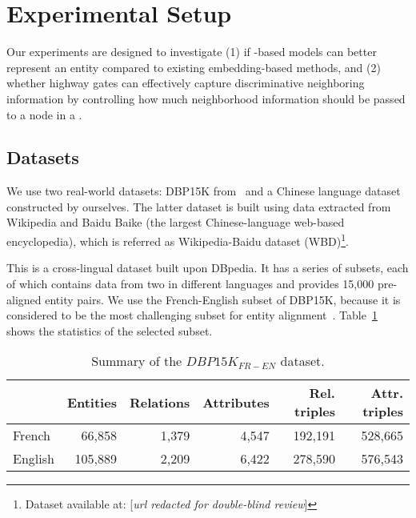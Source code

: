 \section{Experimental Setup}
	Our experiments are designed to investigate (1) if \RGCN-based models can better represent an entity  compared to existing \KG
embedding-based methods, and (2) whether highway gates can effectively capture discriminative neighboring information by controlling how
much neighborhood information should be passed to a node in a \RGCN.

\subsection{Datasets}
\label{subsection:datasets}
	We use two real-world datasets: DBP15K from~\cite{sun2017cross} and a Chinese language dataset constructed by ourselves. The latter
dataset is built using data extracted from Wikipedia and Baidu Baike (the largest Chinese-language web-based encyclopedia), which is
referred as Wikipedia-Baidu dataset (WBD)\footnote{Dataset available at: [\emph{url redacted for double-blind review}]}.
	
	 This is a cross-lingual dataset built upon DBpedia.
	It has a series of subsets, each of which contains data from two \KGs in different languages and provides 15,000 pre-aligned entity pairs.
	We use the French-English subset of DBP15K, because it is considered to be the most challenging subset for entity alignment~\cite{sun2017cross}.
     Table~\ref{dbp} shows the statistics of the selected subset.
	
		\begin{table}
		\centering
		\scriptsize
		\begin{tabular}{l|rrrrr}
			\toprule
			&\bf  Entities &\bf  Relations &\bf  Attributes &\bf  Rel. triples &\bf  Attr. triples \\
			\midrule
			French & 66,858 & 1,379 & 4,547 & 192,191 & 528,665 \\
			English & 105,889 & 2,209 & 6,422 & 278,590 & 576,543 \\
			\bottomrule
		\end{tabular}
		\caption{Summary of the $DBP15K_{FR-EN}$ dataset.}
		\label{dbp}
	\end{table}
	
%	
%	
	
